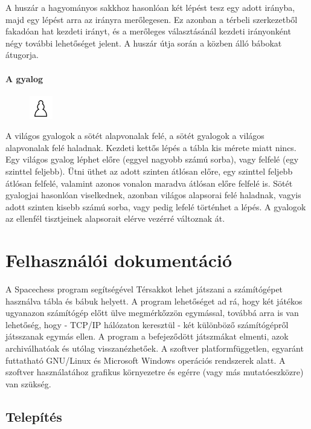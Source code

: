 \documentclass[12pt, twoside]{report}
\begin{document}
A huszár a hagyományos sakkhoz hasonlóan két lépést tesz egy adott irányba, majd egy lépést arra az irányra merőlegesen. Ez azonban a térbeli szerkezetből fakadóan hat kezdeti irányt, és a merőleges választásánál kezdeti irányonként négy további lehetőséget jelent. A huszár útja során a közben álló bábokat átugorja. 

\subsubsection{A gyalog}

\begin{figure}
	\includegraphics[width=10mm, height=10mm]{white-pawn}
\end{figure}

A világos gyalogok a sötét alapvonalak felé, a sötét gyalogok a világos alapvonalak felé haladnak. Kezdeti kettős lépés a tábla kis mérete miatt nincs. Egy világos gyalog léphet előre (eggyel nagyobb számú sorba), vagy felfelé (egy szinttel feljebb). Ütni üthet az adott szinten átlósan előre, egy szinttel feljebb átlósan felfelé, valamint azonos vonalon maradva átlósan előre felfelé is. Sötét gyalogjai hasonlóan viselkednek, azonban világos alapsorai felé haladnak, vagyis adott szinten kisebb számú sorba, vagy pedig lefelé történhet a lépés. A gyalogok az ellenfél tisztjeinek alapsorait elérve vezérré változnak át.

\chapter{Felhasználói dokumentáció}

A Spacechess program segítségével Térsakkot lehet játszani a számítógépet használva tábla és bábuk helyett. A program lehetőséget ad rá, hogy két játékos ugyanazon számítógép előtt ülve megmérkőzzön egymással, továbbá arra is van lehetőség, hogy - TCP/IP hálózaton keresztül - két különböző számítógépről játsszanak egymás ellen. A program a befejeződött játszmákat elmenti, azok archiválhatóak és utólag visszanézhetőek. A szoftver platformfüggetlen, egyaránt futtatható GNU/Linux és Microsoft Windows operációs rendszerek alatt. A szoftver használatához grafikus környezetre és egérre (vagy más mutatóeszközre) van szükség.

\section{Telepítés}
\end{document}
